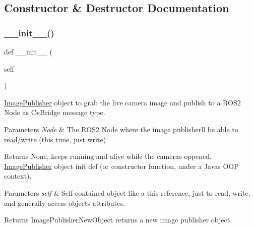 \subsection{Constructor \& Destructor Documentation}
\mbox{\label{classtoxic__vision_1_1webcam__pub_1_1ImagePublisher_ae64f0875afe3067b97ba370b354b9213}} 
\subsubsection{\texorpdfstring{\+\_\+\+\_\+init\+\_\+\+\_\+()}{\_\_init\_\_()}}
{\footnotesize\ttfamily def \+\_\+\+\_\+init\+\_\+\+\_\+ (\begin{DoxyParamCaption}\item[{}]{self }\end{DoxyParamCaption})}



\mbox{\hyperlink{classtoxic__vision_1_1webcam__pub_1_1ImagePublisher}{Image\+Publisher}} object to grab the live camera image and publish to a R\+O\+S2 Node as Cv\+Bridge message type. 


\begin{DoxyParams}{Parameters}
{\em Node} & The R\+O\+S2 Node where the image publisher\textquotesingle{}ll be able to read/write (this time, just write)\\
\hline
\end{DoxyParams}
\begin{DoxyReturn}{Returns}
None, keeps running and alive while the camera\textquotesingle{}s oppened. \mbox{\hyperlink{classtoxic__vision_1_1webcam__pub_1_1ImagePublisher}{Image\+Publisher}} object init def (or constructor function, under a Java\textquotesingle{}s O\+OP context).
\end{DoxyReturn}

\begin{DoxyParams}{Parameters}
{\em self} & Self contained object like a \textquotesingle{}this\textquotesingle{} reference, just to read, write, and generally access object\textquotesingle{}s attributes.\\
\hline
\end{DoxyParams}
\begin{DoxyReturn}{Returns}
Image\+Publisher\+New\+Object returns a new image publisher object. 
\end{DoxyReturn}

